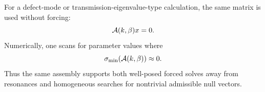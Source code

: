 For a defect-mode or transmission-eigenvalue-type calculation, the same matrix
is used without forcing:
\[
  \mathcal A(k,\beta)x=0 .
\]
Numerically, one scans for parameter values where
\[
  \sigma_{\min}(\mathcal A(k,\beta))\approx 0 .
\]
Thus the same assembly supports both well-posed forced solves away from
resonances and homogeneous searches for nontrivial admissible null vectors.
